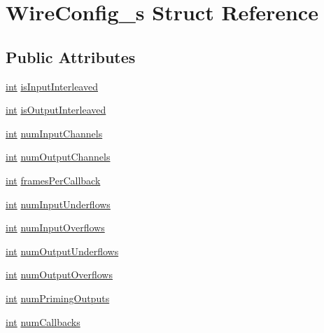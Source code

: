 \hypertarget{struct_wire_config__s}{}\section{Wire\+Config\+\_\+s Struct Reference}
\label{struct_wire_config__s}
\subsection*{Public Attributes}
\begin{DoxyCompactItemize}
\item 
\hyperlink{xmltok_8h_a5a0d4a5641ce434f1d23533f2b2e6653}{int} \hyperlink{struct_wire_config__s_a258a6fd59147d5f22c5a2d6792a0b1d4}{is\+Input\+Interleaved}
\item 
\hyperlink{xmltok_8h_a5a0d4a5641ce434f1d23533f2b2e6653}{int} \hyperlink{struct_wire_config__s_a41f43c21fd081159bcb8a10b3f6a0789}{is\+Output\+Interleaved}
\item 
\hyperlink{xmltok_8h_a5a0d4a5641ce434f1d23533f2b2e6653}{int} \hyperlink{struct_wire_config__s_a941c8949071abe53787684563a10759c}{num\+Input\+Channels}
\item 
\hyperlink{xmltok_8h_a5a0d4a5641ce434f1d23533f2b2e6653}{int} \hyperlink{struct_wire_config__s_a824bae19059758c5416775f747be8b91}{num\+Output\+Channels}
\item 
\hyperlink{xmltok_8h_a5a0d4a5641ce434f1d23533f2b2e6653}{int} \hyperlink{struct_wire_config__s_afcf8b3765bc95ce0deb746c594bd5130}{frames\+Per\+Callback}
\item 
\hyperlink{xmltok_8h_a5a0d4a5641ce434f1d23533f2b2e6653}{int} \hyperlink{struct_wire_config__s_a06a4fbfae6eb431a4ba74306b85c5da6}{num\+Input\+Underflows}
\item 
\hyperlink{xmltok_8h_a5a0d4a5641ce434f1d23533f2b2e6653}{int} \hyperlink{struct_wire_config__s_ab6ad3bddc729c623215467b6de3e008c}{num\+Input\+Overflows}
\item 
\hyperlink{xmltok_8h_a5a0d4a5641ce434f1d23533f2b2e6653}{int} \hyperlink{struct_wire_config__s_aab682654c495c810bf30d6a0153087a8}{num\+Output\+Underflows}
\item 
\hyperlink{xmltok_8h_a5a0d4a5641ce434f1d23533f2b2e6653}{int} \hyperlink{struct_wire_config__s_a008c6314cc94d927319d1ae1bb87ccca}{num\+Output\+Overflows}
\item 
\hyperlink{xmltok_8h_a5a0d4a5641ce434f1d23533f2b2e6653}{int} \hyperlink{struct_wire_config__s_a3f8f88c3fcf030c0e85569d071b23b91}{num\+Priming\+Outputs}
\item 
\hyperlink{xmltok_8h_a5a0d4a5641ce434f1d23533f2b2e6653}{int} \hyperlink{struct_wire_config__s_aa752a834b640e713661f40be07dafb73}{num\+Callbacks}
\end{DoxyCompactItemize}



